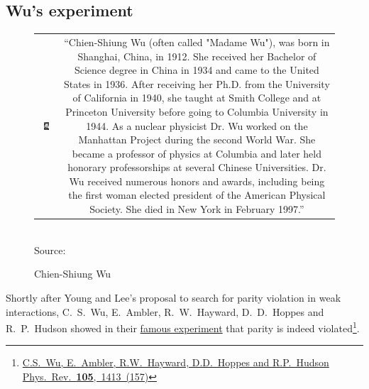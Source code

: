 \subsection{Wu's experiment}
\begin{figure}
\caption{Chien-Shiung Wu}
\begin{tabular}{cc}
\parbox{0.32\textwidth}{
\includegraphics[width=0.3\textwidth]{fig/C_P_CP/Wu.jpg}
}&
\parbox{0.66\textwidth}{\textsf{\small
    ``Chien-Shiung Wu (often called "Madame Wu"), was born in Shanghai, China, in 1912. She
    received her Bachelor of Science degree in China in 1934 and came
    to the United States in 1936. After receiving her Ph.D. from the
    University of California in 1940, she taught at Smith College and
    at Princeton University before going to Columbia University in
    1944. As a nuclear physicist Dr. Wu worked on the Manhattan
    Project during the second World War. She became a professor of
    physics at Columbia and later held honorary professorships at
    several Chinese Universities. Dr. Wu received numerous honors and
    awards, including being the first woman elected president of the
    American Physical Society. She died in New York in February 1997.'' 
}}
\end{tabular}
\\  \textsf{Source: }
\end{figure}
 Shortly after Young and Lee's proposal to search for parity violation in weak interactions, C.~S.~Wu, E.~Ambler, R.~W.~Hayward, D.~D.~Hoppes and
 R.~P.~Hudson showed in their
 \href{http://link.aps.org/abstract/PR/v105/p1413}{famous experiment}
 that parity is indeed
 violated\footnote{\href{http://link.aps.org/abstract/PR/v105/p1413}{C.S.~Wu, 
     E.~Ambler, R.W.~Hayward, D.D.~Hoppes and
     R.P.~Hudson Phys.~Rev.~{\bf 105},~1413~(157)}}.
